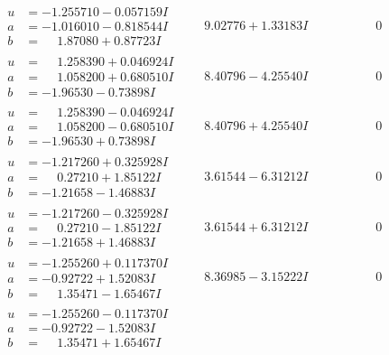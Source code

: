 \documentclass[1p]{elsarticle_modified}
\theoremstyle{definition}
\begin{document}
$$\begin{array}{c|c|c}
\begin{aligned}
u &= -1.255710 - 0.057159 I \\
a &= -1.016010 - 0.818544 I \\
b &= \phantom{-}1.87080 + 0.87723 I\end{aligned}
 & \phantom{-}9.02776 + 1.33183 I & \phantom{-0.000000 } 0 \\ \hline\begin{aligned}
u &= \phantom{-}1.258390 + 0.046924 I \\
a &= \phantom{-}1.058200 + 0.680510 I \\
b &= -1.96530 - 0.73898 I\end{aligned}
 & \phantom{-}8.40796 - 4.25540 I & \phantom{-0.000000 } 0 \\ \hline\begin{aligned}
u &= \phantom{-}1.258390 - 0.046924 I \\
a &= \phantom{-}1.058200 - 0.680510 I \\
b &= -1.96530 + 0.73898 I\end{aligned}
 & \phantom{-}8.40796 + 4.25540 I & \phantom{-0.000000 } 0 \\ \hline\begin{aligned}
u &= -1.217260 + 0.325928 I \\
a &= \phantom{-}0.27210 + 1.85122 I \\
b &= -1.21658 - 1.46883 I\end{aligned}
 & \phantom{-}3.61544 - 6.31212 I & \phantom{-0.000000 } 0 \\ \hline\begin{aligned}
u &= -1.217260 - 0.325928 I \\
a &= \phantom{-}0.27210 - 1.85122 I \\
b &= -1.21658 + 1.46883 I\end{aligned}
 & \phantom{-}3.61544 + 6.31212 I & \phantom{-0.000000 } 0 \\ \hline\begin{aligned}
u &= -1.255260 + 0.117370 I \\
a &= -0.92722 + 1.52083 I \\
b &= \phantom{-}1.35471 - 1.65467 I\end{aligned}
 & \phantom{-}8.36985 - 3.15222 I & \phantom{-0.000000 } 0 \\ \hline\begin{aligned}
u &= -1.255260 - 0.117370 I \\
a &= -0.92722 - 1.52083 I \\
b &= \phantom{-}1.35471 + 1.65467 I\end{aligned}

\end{array}$$
\end{document}
